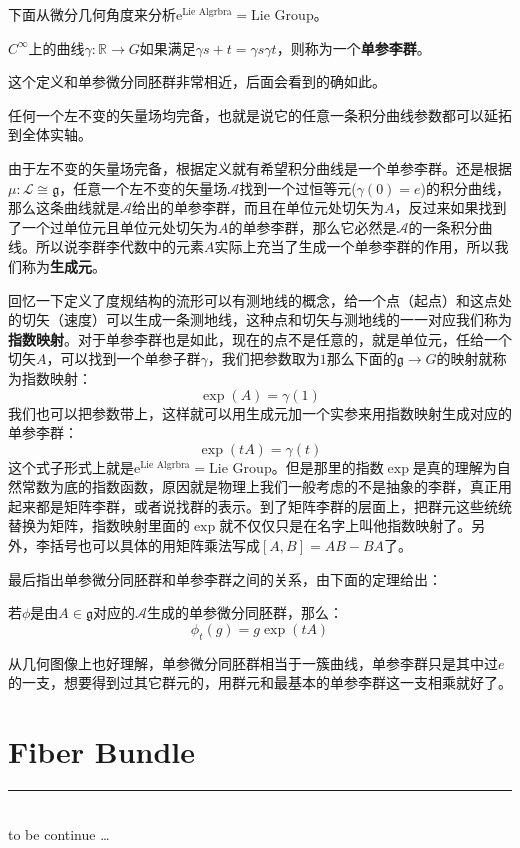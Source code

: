 下面从微分几何角度来分析$\mathrm{e}^{\text{Lie Algrbra}}=\text{Lie Group}$。
\begin{definition}
	$C^{\infty}$上的曲线$\gamma:\mathbb{R}\to G$如果满足$\gamma{s+t}=\gamma{s}\gamma{t}$，则称为一个\textbf{单参李群}。
\end{definition}
这个定义和单参微分同胚群非常相近，后面会看到的确如此。
\begin{theorem}
	任何一个左不变的矢量场均完备，也就是说它的任意一条积分曲线参数都可以延拓到全体实轴。
\end{theorem}
由于左不变的矢量场完备，根据定义就有希望积分曲线是一个单参李群。还是根据$\mu:\mathscr{L}\cong\mathfrak{g}$，任意一个左不变的矢量场$\mathscr{A}$找到一个过恒等元($\gamma(0)=e$)的积分曲线，那么这条曲线就是$\mathscr{A}$给出的单参李群，而且在单位元处切矢为$A$，反过来如果找到了一个过单位元且单位元处切矢为$A$的单参李群，那么它必然是$\mathscr{A}$的一条积分曲线。所以说李群李代数中的元素$A$实际上充当了生成一个单参李群的作用，所以我们称为\textbf{生成元}。

回忆一下定义了度规结构的流形可以有测地线的概念，给一个点（起点）和这点处的切矢（速度）可以生成一条测地线，这种点和切矢与测地线的一一对应我们称为\textbf{指数映射}。对于单参李群也是如此，现在的点不是任意的，就是单位元，任给一个切矢$A$，可以找到一个单参子群$\gamma$，我们把参数取为$1$那么下面的$\mathfrak{g}\to G$的映射就称为指数映射：
\[\exp(A)=\gamma(1)\]
我们也可以把参数带上，这样就可以用生成元加一个实参来用指数映射生成对应的单参李群：
\[\exp(tA)=\gamma(t)\]
这个式子形式上就是$\mathrm{e}^{\text{Lie Algrbra}}=\text{Lie Group}$。但是那里的指数$\exp$是真的理解为自然常数为底的指数函数，原因就是物理上我们一般考虑的不是抽象的李群，真正用起来都是矩阵李群，或者说找群的表示。到了矩阵李群的层面上，把群元这些统统替换为矩阵，指数映射里面的$\exp$就不仅仅只是在名字上叫他指数映射了。另外，李括号也可以具体的用矩阵乘法写成$[A,B]=AB-BA$了。
	
最后指出单参微分同胚群和单参李群之间的关系，由下面的定理给出：
\begin{theorem}
	若$\phi$是由$A\in\mathfrak{g}$对应的$\mathscr{A}$生成的单参微分同胚群，那么：
	\begin{equation}
		\phi_t(g)=g\exp(tA)
	\end{equation}
\end{theorem}
从几何图像上也好理解，单参微分同胚群相当于一簇曲线，单参李群只是其中过$e$的一支，想要得到过其它群元的，用群元和最基本的单参李群这一支相乘就好了。
\section*{Fiber Bundle}
{\color{red}\hrule}
\hspace*{\fill} \\%

to be continue \ldots